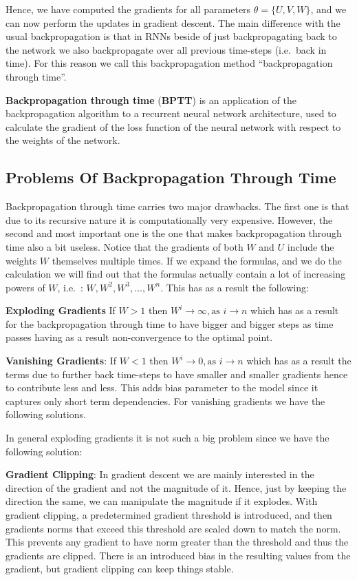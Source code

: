 Hence, we have computed the gradients for all parameters $\theta = \{U, V, W\}$, and we can now perform the updates in
gradient descent. The main difference with the usual backpropagation is that in RNNs beside of just backpropagating
back to the network we also backpropagate over all previous time-steps (i.e.\ back in time). For this reason we call
this backpropagation method ``backpropagation through time''.

\textbf{Backpropagation through time} (\textbf{BPTT}) is an application of the backpropagation algorithm to a recurrent
neural network architecture, used to calculate the gradient of the loss function of the neural network with respect to
the weights of the network.
\ed

\subsection{Problems Of Backpropagation Through Time}

Backpropagation through time carries two major drawbacks. The first one is that due to its recursive nature it is
computationally very expensive. However, the second and most important one is the one that makes backpropagation
through time also a bit useless. Notice that the gradients of both $W$ and $U$ include the weights $W$ themselves
multiple times. If we expand the formulas, and we do the calculation we will find out that the formulas actually
contain a lot of increasing powers of $W$, i.e.\ : $W, W^2, W^3, \ldots, W^n$. This has as a result the following:
\bit
\item \textbf{Exploding Gradients} If $W > 1$ then $W^i \to \infty, \text{as } i \to n$ which has as a result for
the backpropagation through time to have bigger and bigger steps as time passes having as a result non-convergence to
the optimal point.
\item \textbf{Vanishing Gradients}: If $W < 1$ then $W^i \to 0, \text{as } i \to n$ which has as a result the terms
due to further back time-steps to have smaller and smaller gradients hence to contribute less and less. This adds
bias parameter to the model since it captures only short term dependencies. For vanishing gradients we have the
following solutions.
\eit

In general exploding gradients it is not such a big problem since we have the following solution:
\bit
\item \textbf{Gradient Clipping}: In gradient descent we are mainly interested in the direction of the gradient and
not the magnitude of it. Hence, just by keeping the direction the same, we can manipulate the magnitude if it
explodes. With gradient clipping, a predetermined gradient threshold is introduced, and then gradients norms that
exceed this threshold are scaled down to match the norm. This prevents any gradient to have norm greater than the
threshold and thus the gradients are clipped. There is an introduced bias in the resulting values from the gradient,
but gradient clipping can keep things stable.
\eit

